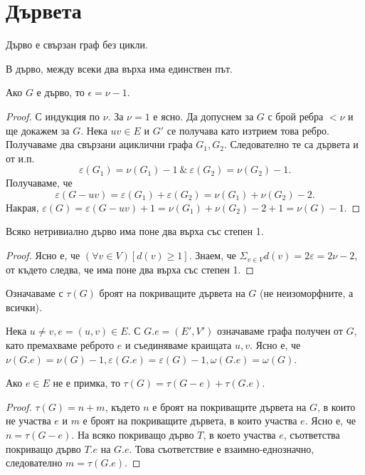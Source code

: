 \section{Дървета}
\label{sect:tree}

\begin{dfn}
  Дърво е свързан граф без цикли.
\end{dfn}

\begin{thm}
  В дърво, между всеки два върха има единствен път.
\end{thm}

\begin{thm}
  Ако $G$ е дърво, то $\epsilon = \nu - 1$.
\end{thm}
\begin{proof}
  С индукция по $\nu$. За $\nu = 1$ е ясно.
  Да допуснем за $G$ с брой ребра $<\nu$ и ще докажем за $G$.
  Нека $uv\in E$ и $G'$ се получава като изтрием това ребро.
  Получаваме два свързани ациклични графа $G_1, G_2$.
  Следователно те са дървета и от и.п. 
  \[\varepsilon(G_1) = \nu(G_1) - 1\ \&\ \varepsilon(G_2) = \nu(G_2) - 1.\]
  Получаваме, че 
  \[\varepsilon(G - uv) = \varepsilon(G_1) + \varepsilon(G_2) = \nu(G_1) + \nu(G_2) - 2.\]
  Накрая, $\varepsilon(G) = \varepsilon(G-uv) + 1 = \nu(G_1) + \nu(G_2) - 2 + 1= \nu(G) - 1$.
\end{proof}

\begin{corollary}
  Всяко нетривиално дърво има поне два върха със степен 1.
\end{corollary}
\begin{proof}
  Ясно е, че $(\forall v\in V)[d(v) \geq 1]$.
  Знаем, че $\Sigma_{v\in V}d(v) = 2\varepsilon = 2\nu - 2$, от където следва, че има поне два върха със степен 1.
\end{proof}



Означаваме с $\tau(G)$ броят на покриващите дървета на $G$ (не неизоморфните, а всички).

Нека $u\neq v, e = (u,v)\in E$. С $G.e = (E',V')$ означаваме графа получен от $G$, като премахваме реброто $e$ и 
съединяваме краищата $u,v$. Ясно е, че $\nu(G.e) = \nu(G) - 1, \varepsilon(G.e) = \varepsilon(G) - 1, \omega(G.e) = \omega(G)$.

\begin{thm}
  Ако $e\in E$ не е примка, то
  $\tau(G) = \tau(G-e) + \tau(G.e)$.
\end{thm}
\begin{proof}
  $\tau(G) = n + m$, където $n$ е броят на покриващите дървета на $G$, в които не участва $e$
  и $m$ е броят на покриващите дървета, в които участва $e$.
  Ясно е, че $n = \tau(G-e)$.
  На всяко покриващо дърво $T$, в което участва $e$, съответства покриващо дърво $T.e$ на $G.e$.
  Това съответствие е взаимно-еднозначно, следователно $m = \tau(G.e)$.
\end{proof}

